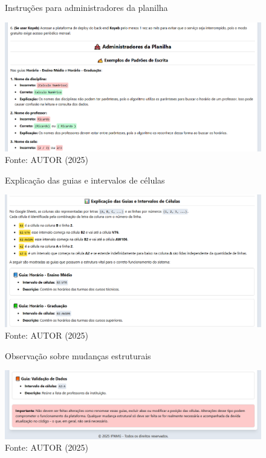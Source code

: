 \begin{figure}[htb]
    \centering
    \caption{Instruções para administradores da planilha}
    \includegraphics[width=1\textwidth]{Figuras/doc-2.png}
    \caption*{Fonte: AUTOR (2025)}
    \label{fig_doc_2}
\end{figure}

\begin{figure}[htb]
    \centering
    \caption{Explicação das guias e intervalos de células}
    \includegraphics[width=1\textwidth]{Figuras/doc-3.png}
    \caption*{Fonte: AUTOR (2025)}
    \label{fig_doc_3}
\end{figure}

\begin{figure}[htb]
    \centering
    \caption{Observação sobre mudanças estruturais}
    \includegraphics[width=1\textwidth]{Figuras/doc-4.png}
    \caption*{Fonte: AUTOR (2025)}
    \label{fig_doc_4}
\end{figure}